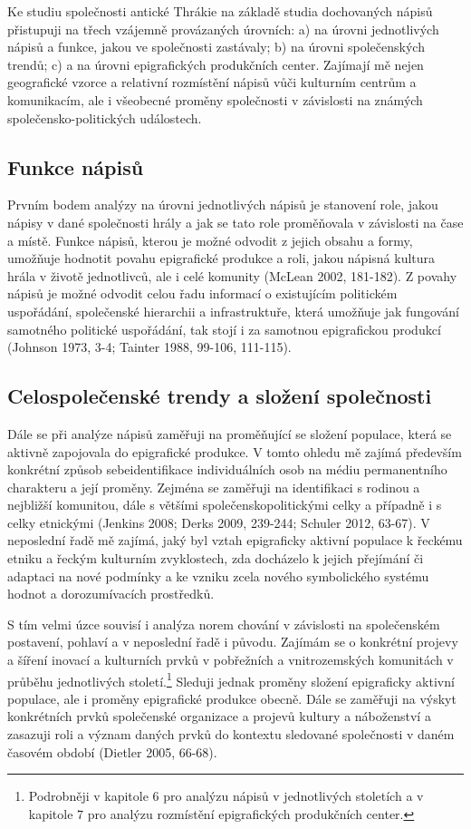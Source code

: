 Ke studiu společnosti antické Thrákie na základě studia dochovaných nápisů přistupuji na třech vzájemně provázaných úrovních: a) na úrovni jednotlivých nápisů a funkce, jakou ve společnosti zastávaly; b) na úrovni společenských trendů; c) a na úrovni epigrafických produkčních center. Zajímají mě nejen geografické vzorce a relativní rozmístění nápisů vůči kulturním centrům a komunikacím, ale i všeobecné proměny společnosti v závislosti na známých společensko-politických událostech.

\subsection[funkce-nápisů]{Funkce nápisů}

Prvním bodem analýzy na úrovni jednotlivých nápisů je stanovení role, jakou nápisy v dané společnosti hrály a jak se tato role proměňovala v závislosti na čase a místě. Funkce nápisů, kterou je možné odvodit z jejich obsahu a formy, umožňuje hodnotit povahu epigrafické produkce a roli, jakou nápisná kultura hrála v životě jednotlivců, ale i celé komunity (McLean 2002, 181-182). Z povahy nápisů je možné odvodit celou řadu informací o existujícím politickém uspořádání, společenské hierarchii a infrastruktuře, která umožňuje jak fungování samotného politické uspořádání, tak stojí i za samotnou epigrafickou produkcí (Johnson 1973, 3-4; Tainter 1988, 99-106, 111-115).

\subsection[celospolečenské-trendy-a-složení-společnosti]{Celospolečenské trendy a složení společnosti}

Dále se při analýze nápisů zaměřuji na proměňující se složení populace, která se aktivně zapojovala do epigrafické produkce. V tomto ohledu mě zajímá především konkrétní způsob sebeidentifikace individuálních osob na médiu permanentního charakteru a její proměny. Zejména se zaměřuji na identifikaci s rodinou a nejbližší komunitou, dále s většími společenskopolitickými celky a případně i s celky etnickými (Jenkins 2008; Derks 2009, 239-244; Schuler 2012, 63-67). V neposlední řadě mě zajímá, jaký byl vztah epigraficky aktivní populace k řeckému etniku a řeckým kulturním zvyklostech, zda docházelo k jejich přejímání či adaptaci na nové podmínky a ke vzniku zcela nového symbolického systému hodnot a dorozumívacích prostředků.

S tím velmi úzce souvisí i analýza norem chování v závislosti na společenském postavení, pohlaví a v neposlední řadě i původu. Zajímám se o konkrétní projevy a šíření inovací a kulturních prvků v pobřežních a vnitrozemských komunitách v průběhu jednotlivých století.\footnote{Podrobněji v kapitole 6 pro analýzu nápisů v jednotlivých stoletích a v kapitole 7 pro analýzu rozmístění epigrafických produkčních center.} Sleduji jednak proměny složení epigraficky aktivní populace, ale i proměny epigrafické produkce obecně. Dále se zaměřuji na výskyt konkrétních prvků společenské organizace a projevů kultury a náboženství a zasazuji roli a význam daných prvků do kontextu sledované společnosti v daném časovém období (Dietler 2005, 66-68).

